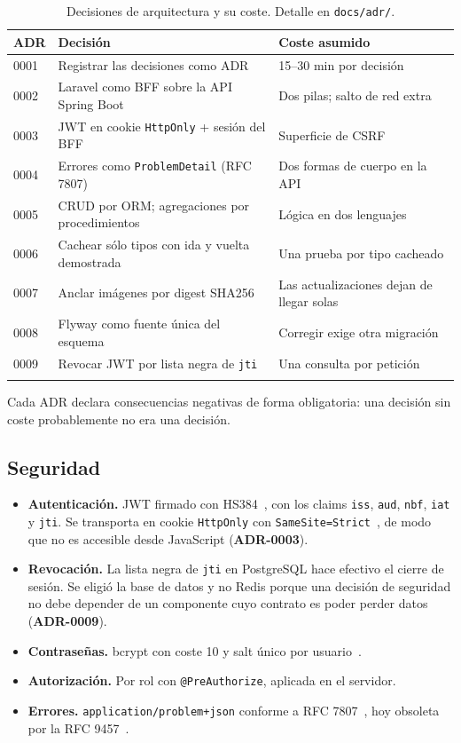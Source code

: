 \documentclass[11pt,a4paper]{article}
\newcommand{\adr}[1]{\textbf{ADR-#1}}
\begin{document}
\begin{longtable}{@{}p{1.6cm}p{8.6cm}p{4.3cm}@{}}
\toprule
\textbf{ADR} & \textbf{Decisión} & \textbf{Coste asumido} \\
\midrule
\endhead
0001 & Registrar las decisiones como ADR & 15--30 min por decisión \\
0002 & Laravel como BFF sobre la API Spring Boot & Dos pilas; salto de red extra \\
0003 & JWT en cookie \texttt{HttpOnly} + sesión del BFF & Superficie de CSRF \\
0004 & Errores como \texttt{ProblemDetail} (RFC 7807) & Dos formas de cuerpo en la API \\
0005 & CRUD por ORM; agregaciones por procedimientos & Lógica en dos lenguajes \\
0006 & Cachear sólo tipos con ida y vuelta demostrada & Una prueba por tipo cacheado \\
0007 & Anclar imágenes por digest SHA256 & Las actualizaciones dejan de llegar solas \\
0008 & Flyway como fuente única del esquema & Corregir exige otra migración \\
0009 & Revocar JWT por lista negra de \texttt{jti} & Una consulta por petición \\
\bottomrule
\caption{Decisiones de arquitectura y su coste. Detalle en \texttt{docs/adr/}.}
\end{longtable}

Cada ADR declara consecuencias negativas de forma obligatoria: una decisión sin
coste probablemente no era una decisión.

\subsection{Seguridad}

\begin{itemize}[leftmargin=*]
  \item \textbf{Autenticación.} JWT firmado con HS384~\cite{rfc7519}, con los
        claims \texttt{iss}, \texttt{aud}, \texttt{nbf}, \texttt{iat} y
        \texttt{jti}. Se transporta en cookie \texttt{HttpOnly} con
        \texttt{SameSite=Strict}~\cite{rfc6265bis}, de modo que no es accesible
        desde JavaScript (\adr{0003}).
  \item \textbf{Revocación.} La lista negra de \texttt{jti} en PostgreSQL hace
        efectivo el cierre de sesión. Se eligió la base de datos y no Redis porque
        una decisión de seguridad no debe depender de un componente cuyo contrato
        es poder perder datos (\adr{0009}).
  \item \textbf{Contraseñas.} bcrypt con coste 10 y salt único por
        usuario~\cite{provos1999bcrypt}.
  \item \textbf{Autorización.} Por rol con \texttt{@PreAuthorize}, aplicada en el
        servidor.
  \item \textbf{Errores.} \texttt{application/problem+json} conforme a RFC
        7807~\cite{rfc7807}, hoy obsoleta por la RFC 9457~\cite{rfc9457}.
\end{itemize}
\end{document}

